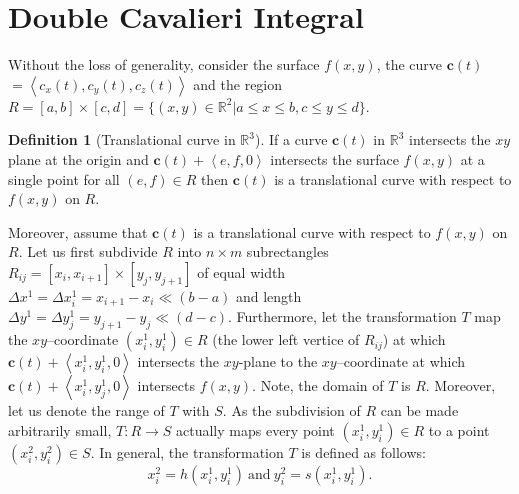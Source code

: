 \documentclass{article}
\theoremstyle{theorem}
\theoremstyle{definition}
\newtheorem*{definition}{Definition}
\begin{document}
\section{Double Cavalieri Integral}
Without the loss of generality, consider the surface $f(x,y)$, the curve $\mathbf{c}(t)$\\$=\left <c_x(t),c_y(t), c_z(t) \right >$ and the region $R = [a,b]\times [c,d] = \{(x,y)\in \mathbb{R}^2|a \leq x \leq b, c \leq y \leq d\}$.

\begin{definition}[Translational curve in $\mathbb{R}^3$]
If a curve $\mathbf{c}(t)$ in $\mathbb{R}^3$ intersects the $xy$ plane at the origin and $\mathbf{c}(t) + \left < e,f,0 \right >$ intersects 
the surface $f(x,y)$ at a single point for all $(e,f)\in R$ then $\mathbf{c}(t)$ is a translational curve 
with respect to $f(x,y)$ on $R$. 
\end{definition}

\noindent
Moreover, assume that $\mathbf{c}(t)$ is a translational curve with respect to $f(x,y)$ on $R$. Let us first subdivide $R$ into $n\times m$ subrectangles $R_{ij} = [x_{i},x_{i+1}] \times [y_{j},y_{j+1}]$ of equal width $\Delta x^1 = \Delta x_i^1 = x_{i+1}-x_i\ll (b-a)$ and length $\Delta y^1= \Delta y_j^1 = y_{j+1}-y_j\ll(d-c)$.
Furthermore, let the transformation $T$ map the $xy$--coordinate $(x_i^1,y_i^1)\in R$ (the lower left vertice of $R_{ij}$) at which $\mathbf{c}(t) + \left <x_i^1,y_i^1,0 \right >$ intersects the 
$xy$-plane to the $xy$--coordinate at which $\mathbf{c}(t) + \left <x_i^1,y_j^1,0 \right >$ intersects $f(x,y)$. Note, the domain of $T$ is $R$. Moreover, let us denote the range 
of $T$ with $S$. As the subdivision of $R$ can be made arbitrarily small, $T:R\rightarrow S$ actually maps every point $(x_i^1,y_i^1)\in R$ to a point $(x_i^2,y_i^2)\in S$. In general, the transformation $T$ is defined as follows:
\begin{equation}
x_i^2 = h(x_i^1,y_i^1)~\textrm{and}~y_i^2 = s(x_i^1,y_i^1).
\end{equation}



\end{document}
